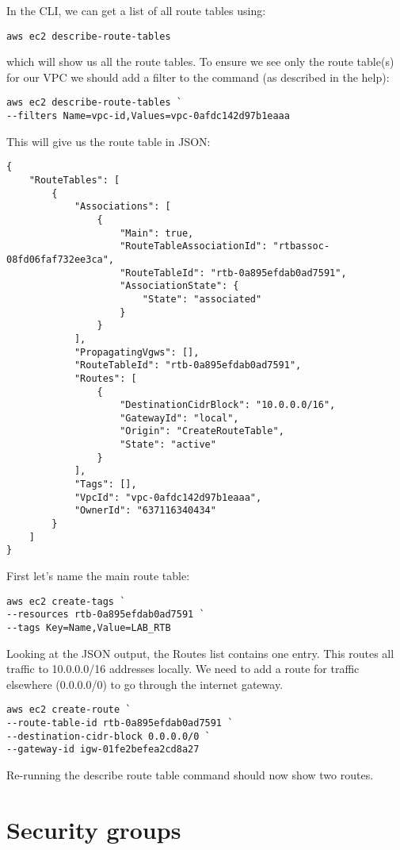 \documentclass{pgnotes}
\begin{document}
In the CLI, we can get a list of all route tables using:
\begin{verbatim}
aws ec2 describe-route-tables
\end{verbatim}
which will show us all the route tables.
To ensure we see only the route table(s) for our VPC we should add a filter to the command (as described in the help):
\begin{verbatim}
aws ec2 describe-route-tables `
--filters Name=vpc-id,Values=vpc-0afdc142d97b1eaaa
\end{verbatim}
This will give us the route table in JSON:
\begin{verbatim}
{
    "RouteTables": [
        {
            "Associations": [
                {
                    "Main": true,
                    "RouteTableAssociationId": "rtbassoc-08fd06faf732ee3ca",
                    "RouteTableId": "rtb-0a895efdab0ad7591",
                    "AssociationState": {
                        "State": "associated"
                    }
                }
            ],
            "PropagatingVgws": [],
            "RouteTableId": "rtb-0a895efdab0ad7591",
            "Routes": [
                {
                    "DestinationCidrBlock": "10.0.0.0/16",
                    "GatewayId": "local",
                    "Origin": "CreateRouteTable",
                    "State": "active"
                }
            ],
            "Tags": [],
            "VpcId": "vpc-0afdc142d97b1eaaa",
            "OwnerId": "637116340434"
        }
    ]
}
\end{verbatim}
First let's name the main route table:
\begin{verbatim}
aws ec2 create-tags `
--resources rtb-0a895efdab0ad7591 `
--tags Key=Name,Value=LAB_RTB
\end{verbatim}
Looking at the JSON output, the Routes list contains one entry.
This routes all traffic to 10.0.0.0/16 addresses locally.
We need to add a route for traffic elsewhere (0.0.0.0/0) to go through the internet gateway.
\begin{verbatim}
aws ec2 create-route `
--route-table-id rtb-0a895efdab0ad7591 `
--destination-cidr-block 0.0.0.0/0 `
--gateway-id igw-01fe2befea2cd8a27
\end{verbatim}
Re-running the describe route table command should now show two routes.


\section{Security groups}
\end{document}
